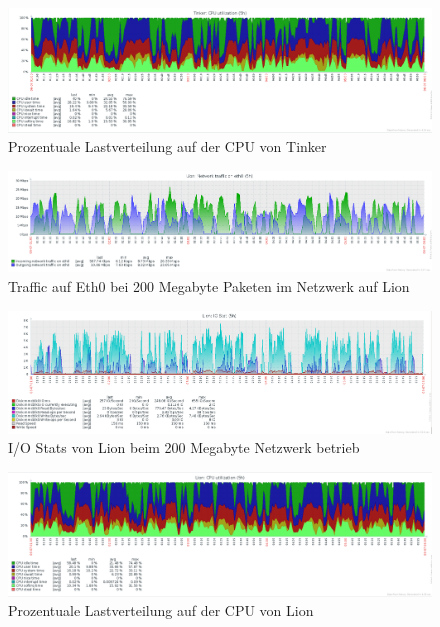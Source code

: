 \begin{figure}[htbp]
\centering
\includegraphics*[width=0.9\linewidth, angle=90]{Abb/ZabbixTinker/Standard/CPUStandard200}

\caption{Prozentuale Lastverteilung auf der CPU von Tinker}
\label{fig:CPUTinker200}
\end{figure}



\begin{figure}[htbp]
\centering
\includegraphics*[width=0.9\linewidth, angle=90]{Abb/ZabbixLion/Standard/Standard200}

\caption{Traffic auf Eth0 bei 200 Megabyte Paketen im Netzwerk auf Lion}
\label{fig:Eth0Lion200}
\end{figure}


\begin{figure}[htbp]
\centering
\includegraphics*[width=0.9\linewidth, angle=90]{Abb/ZabbixLion/Standard/IoStatStandard200}

\caption{I/O Stats von Lion beim 200 Megabyte Netzwerk betrieb}
\label{fig:IoStatLion200}
\end{figure} %

\begin{figure}[htbp]
\centering
\includegraphics*[width=0.9\linewidth, angle=90]{Abb/ZabbixLion/Standard/CPUStandard200}

\caption{Prozentuale Lastverteilung auf der CPU von Lion}
\label{fig:CPULion200}
\end{figure}


